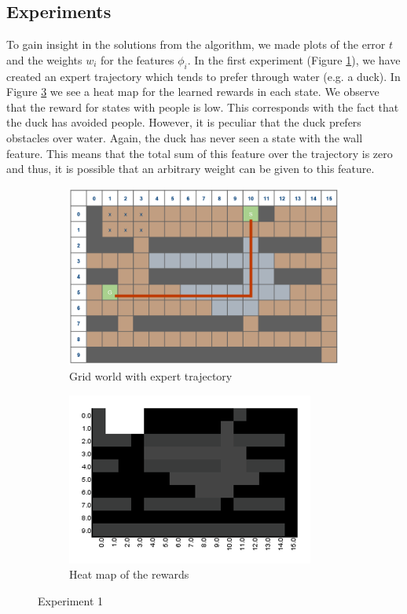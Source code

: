 \documentclass[10pt,a4paper,twocolumn]{article}
\begin{document}
\subsection{Experiments}
To gain insight in the solutions from the algorithm, we made plots of the error $t$ and the weights $w_i$ for the features $\phi_i$. In the first experiment (Figure \ref{fig:experiment1trajectory}), we have created an expert trajectory which tends to prefer through water (e.g. a duck). In Figure \ref{fig:experiment1heatmap} we see a heat map for the learned rewards in each state. We observe that the reward for states with people is low. This corresponds with the fact that the duck has avoided people. However, it is peculiar that the duck prefers obstacles over water. Again, the duck has never seen a state with the wall feature. This means that the total sum of this feature over the trajectory is zero and thus, it is possible that an arbitrary weight can be given to this feature.
\begin{figure}[h]
\begin{subfigure}[b]{0.5\textwidth}
	\includegraphics[width=\textwidth]{experiment_1_gridworld}
	\caption{Grid world with expert trajectory}
	\label{fig:experiment1trajectory}
\end{subfigure}
\begin{subfigure}[b]{0.5\textwidth}
	\includegraphics[width=\textwidth]{experiment_1_heatmap}
	\caption{Heat map of the rewards}
	\label{fig:experiment1heatmap}
\end{subfigure}
\caption{Experiment 1}
\end{figure}
\end{document}
